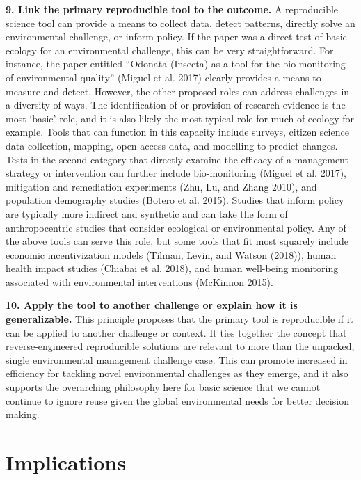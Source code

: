 \documentclass[fleqn,10pt]{wlpeerj} %
\begin{document}
\textbf{9. Link the primary reproducible tool to the outcome.} A
reproducible science tool can provide a means to collect data, detect
patterns, directly solve an environmental challenge, or inform policy.
If the paper was a direct test of basic ecology for an environmental
challenge, this can be very straightforward. For instance, the paper
entitled ``Odonata (Insecta) as a tool for the bio-monitoring of
environmental quality'' (Miguel et al. 2017) clearly provides a means to
measure and detect. However, the other proposed roles can address
challenges in a diversity of ways. The identification of or provision of
research evidence is the most `basic' role, and it is also likely the
most typical role for much of ecology for example. Tools that can
function in this capacity include surveys, citizen science data
collection, mapping, open-access data, and modelling to predict changes.
Tests in the second category that directly examine the efficacy of a
management strategy or intervention can further include bio-monitoring
(Miguel et al. 2017), mitigation and remediation experiments (Zhu, Lu,
and Zhang 2010), and population demography studies (Botero et al. 2015).
Studies that inform policy are typically more indirect and synthetic and
can take the form of anthropocentric studies that consider ecological or
environmental policy. Any of the above tools can serve this role, but
some tools that fit most squarely include economic incentivization
models (Tilman, Levin, and Watson (2018)), human health impact studies
(Chiabai et al. 2018), and human well-being monitoring associated with
environmental interventions (McKinnon 2015).

\textbf{10. Apply the tool to another challenge or explain how it is
generalizable.} This principle proposes that the primary tool is
reproducible if it can be applied to another challenge or context. It
ties together the concept that reverse-engineered reproducible solutions
are relevant to more than the unpacked, single environmental management
challenge case. This can promote increased in efficiency for tackling
novel environmental challenges as they emerge, and it also supports the
overarching philosophy here for basic science that we cannot continue to
ignore reuse given the global environmental needs for better decision
making.

\section*{Implications}\label{implications}
\end{document}
